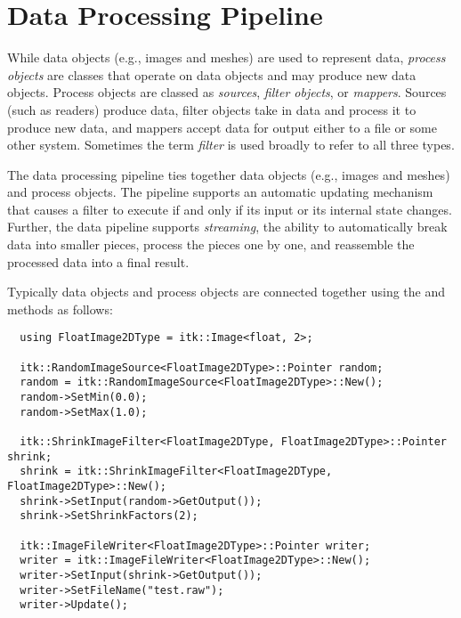 \section{Data Processing Pipeline}
\label{sec:DataProcessingPipeline}



While data objects (e.g., images and meshes) are used to represent data,
\emph{process objects} are classes that operate on data objects and may
produce new data objects. Process objects are classed as
\emph{sources}, \emph{filter objects}, or \emph{mappers}.  Sources (such as
readers) produce data, filter objects take in data and process it to produce
new data, and mappers accept data for output either to a file or
some other system.  Sometimes the term \emph{filter} is used broadly
to refer to all three types.


The data processing pipeline ties together data objects (e.g., images and
meshes) and process objects. The pipeline supports an automatic updating
mechanism that causes a filter to execute if and only if its input
or its internal state changes. Further, the data pipeline supports
\emph{streaming}, the ability to automatically break data into smaller
pieces, process the pieces one by one, and reassemble the processed data into
a final result.

Typically data objects and process objects are connected together using the
 and  methods as follows:

\small
\begin{verbatim}
  using FloatImage2DType = itk::Image<float, 2>;

  itk::RandomImageSource<FloatImage2DType>::Pointer random;
  random = itk::RandomImageSource<FloatImage2DType>::New();
  random->SetMin(0.0);
  random->SetMax(1.0);

  itk::ShrinkImageFilter<FloatImage2DType, FloatImage2DType>::Pointer shrink;
  shrink = itk::ShrinkImageFilter<FloatImage2DType, FloatImage2DType>::New();
  shrink->SetInput(random->GetOutput());
  shrink->SetShrinkFactors(2);

  itk::ImageFileWriter<FloatImage2DType>::Pointer writer;
  writer = itk::ImageFileWriter<FloatImage2DType>::New();
  writer->SetInput(shrink->GetOutput());
  writer->SetFileName("test.raw");
  writer->Update();
\end{verbatim}
\normalsize


